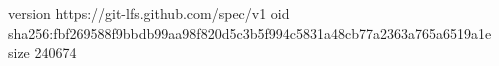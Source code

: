 version https://git-lfs.github.com/spec/v1
oid sha256:fbf269588f9bbdb99aa98f820d5c3b5f994c5831a48cb77a2363a765a6519a1e
size 240674
